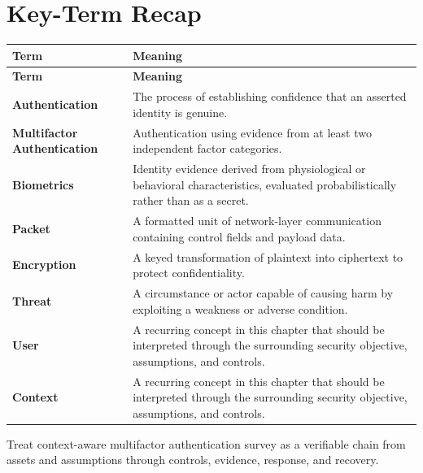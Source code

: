 \documentclass[11pt]{article}
\begin{document}
\section*{Key-Term Recap}
\begin{longtable}{>{\RaggedRight\arraybackslash}p{}>{\RaggedRight\arraybackslash}p{}}
\toprule\rowcolor{Navy}\color{white}\textbf{Term} & \color{white}\textbf{Meaning}\\\midrule
\endfirsthead
\toprule\rowcolor{Navy}\color{white}\textbf{Term} & \color{white}\textbf{Meaning}\\\midrule
\endhead
\textbf{Authentication} & The process of establishing confidence that an asserted identity is genuine. \\\midrule
\textbf{Multifactor Authentication} & Authentication using evidence from at least two independent factor categories. \\\midrule
\textbf{Biometrics} & Identity evidence derived from physiological or behavioral characteristics, evaluated probabilistically rather than as a secret. \\\midrule
\textbf{Packet} & A formatted unit of network-layer communication containing control fields and payload data. \\\midrule
\textbf{Encryption} & A keyed transformation of plaintext into ciphertext to protect confidentiality. \\\midrule
\textbf{Threat} & A circumstance or actor capable of causing harm by exploiting a weakness or adverse condition. \\\midrule
\textbf{User} & A recurring concept in this chapter that should be interpreted through the surrounding security objective, assumptions, and controls. \\\midrule
\textbf{Context} & A recurring concept in this chapter that should be interpreted through the surrounding security objective, assumptions, and controls. \\\midrule
\bottomrule
\end{longtable}
\begin{takeawaybox}
Treat context-aware multifactor authentication survey as a verifiable chain from assets and assumptions through controls, evidence, response, and recovery.
\end{takeawaybox}
\end{document}
